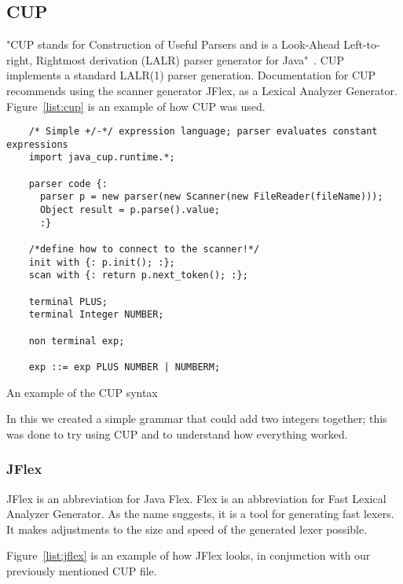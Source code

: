 \subsection{CUP}
"CUP stands for Construction of Useful Parsers and is a Look-Ahead Left-to-right, Rightmost derivation (LALR) parser generator for Java"~\cite{cupParserGenerator}. CUP implements a standard LALR(1) parser generation. Documentation for CUP recommends using the scanner generator JFlex, as a Lexical Analyzer Generator. Figure~\ref{list:cup} is an example of how CUP was used.


\begin{listing}[htb!]
  \centering
  \begin{verbatim}
    /* Simple +/-*/ expression language; parser evaluates constant expressions
    import java_cup.runtime.*;

    parser code {:
      parser p = new parser(new Scanner(new FileReader(fileName)));
      Object result = p.parse().value;  
      :}

    /*define how to connect to the scanner!*/
    init with {: p.init(); :};
    scan with {: return p.next_token(); :};

    terminal PLUS;
    terminal Integer NUMBER;

    non terminal exp;

    exp ::= exp PLUS NUMBER | NUMBERM;

  \end{verbatim}
  \caption{An example of the CUP syntax}
  \label{list:cup}
\end{listing}

In this we created a simple grammar that could add two integers together; this was done to try using CUP and to understand how everything worked.


\subsubsection{JFlex}
JFlex is an abbreviation for Java Flex. Flex is an abbreviation for Fast Lexical Analyzer Generator. As the name suggests, it is a tool for generating fast lexers. It makes adjustments to the size and speed of the generated lexer possible.

Figure~\ref{list:jflex} is an example of how JFlex looks, in conjunction with our previously mentioned CUP file.


